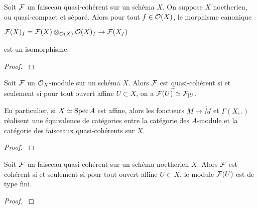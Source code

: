 \begin{prop}\label{FQCProp2}
Soit $\mathcal{F}$ un faisceau quasi-cohérent sur un schéma $X$. On suppose $X$ noetherien, ou quasi-compact et séparé. Alors pour tout $f\in \mathcal{O}(X)$, le morphisme canonique
\begin{center}
$\mathcal{F}(X)_f=\mathcal{F}(X)\otimes_{\mathcal{O}(X)}\mathcal{O}(X)_f\rightarrow \mathcal{F}(X_f)$
\end{center}
est un isomorphisme.
\end{prop}
\begin{proof}
\cite[5.1.6]{QingLiu}
\end{proof}

\begin{thm}\label{FQCThm}
Soit $\mathcal{F}$ un $\mathcal{O}_X$-module sur un schéma $X$. Alors $\mathcal{F}$ est quasi-cohérent si et seulement si pour tout ouvert affine $U\subset X$, on a $\mathcal{F}(U)^{\widetilde{}}\simeq\mathcal{F}_{|U}$.

En particulier, si $X\simeq \operatorname{Spec} A$ est affine, alors les foncteurs $M\mapsto \widetilde{M}$ et $\Gamma(X,.)$ réalisent une équivalence de catégories entre la catégorie des $A$-module et la catégorie des faisceaux quasi-cohérents sur $X$.
\end{thm}
\begin{proof}
\cite[5.1.7]{QingLiu}
\end{proof}

\begin{prop}
Soit $\mathcal{F}$ un faisceau quasi-cohérent sur un schéma noetherien $X$. Alors $\mathcal{F}$ est cohérent si et seulement si pour tout ouvert affine $U\subset X$, le module $\mathcal{F}(U)$ est de type fini. 
\end{prop}
\begin{proof}
\cite[5.1.11]{QingLiu}
\end{proof}

